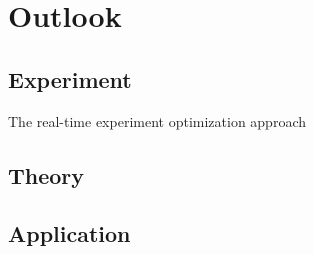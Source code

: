 \chapter{Outlook}
\section{Experiment}
The real-time experiment optimization approach
\section{Theory}
\section{Application}